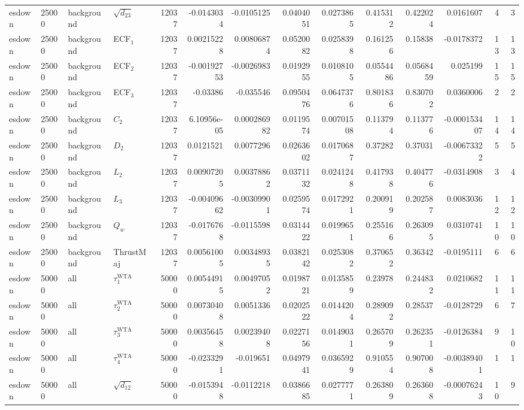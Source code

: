 \begin{landscape}
\begin{longtable}{llll r rrrr rr r rr}
esdown & 25000 & background & $\sqrt{d_{23}}$ & 12037 & -0.0143034 & -0.0105125 & 0.0404051 & 0.0273865 & 0.415312 & 0.422024 & 0.0161607 & 4 & 3 \\
esdown & 25000 & background & ECF$_1$ & 12037 & 0.00215228 & 0.00806874 & 0.0520082 & 0.0258398 & 0.161256 & 0.15838 & -0.0178372 & 13 & 13 \\
esdown & 25000 & background & ECF$_2$ & 12037 & -0.00192753 & -0.0026983 & 0.0192955 & 0.0108105 & 0.0554486 & 0.0568459 & 0.025199 & 15 & 15 \\
esdown & 25000 & background & ECF$_3$ & 12037 & -0.03386 & -0.035546 & 0.0950476 & 0.0647376 & 0.801836 & 0.830702 & 0.0360006 & 2 & 2 \\
esdown & 25000 & background & $C_2$ & 12037 & 6.10956e-05 & 0.000286982 & 0.0119574 & 0.00701508 & 0.113794 & 0.113776 & -0.000153407 & 14 & 14 \\
esdown & 25000 & background & $D_2$ & 12037 & 0.0121521 & 0.0077296 & 0.0263602 & 0.0170687 & 0.37282 & 0.37031 & -0.00673322 & 5 & 5 \\
esdown & 25000 & background & $L_2$ & 12037 & 0.00907205 & 0.00378862 & 0.0371132 & 0.0241248 & 0.417938 & 0.404776 & -0.0314908 & 3 & 4 \\
esdown & 25000 & background & $L_3$ & 12037 & -0.00409662 & -0.00309901 & 0.0259574 & 0.0172921 & 0.200919 & 0.202587 & 0.0083036 & 12 & 12 \\
esdown & 25000 & background & $Q_w$ & 12037 & -0.0176768 & -0.0115598 & 0.0314422 & 0.0199651 & 0.255166 & 0.263095 & 0.0310741 & 10 & 10 \\
esdown & 25000 & background & ThrustMaj & 12037 & 0.00561005 & 0.00348935 & 0.0382142 & 0.0253082 & 0.370652 & 0.36342 & -0.0195111 & 6 & 6 \\
esdown & 50000 & all & $\tau_1^{\mathrm{WTA}}$ & 50000 & 0.00544915 & 0.00497052 & 0.0198721 & 0.0135859 & 0.23978 & 0.244832 & 0.0210682 & 11 & 11 \\
esdown & 50000 & all & $\tau_2^{\mathrm{WTA}}$ & 50000 & 0.00730408 & 0.0051336 & 0.0202522 & 0.0144204 & 0.289092 & 0.28537 & -0.0128729 & 6 & 7 \\
esdown & 50000 & all & $\tau_3^{\mathrm{WTA}}$ & 50000 & 0.00356458 & 0.00239408 & 0.0227156 & 0.0149031 & 0.265709 & 0.262351 & -0.0126384 & 9 & 10 \\
esdown & 50000 & all & $\tau_4^{\mathrm{WTA}}$ & 50000 & -0.0233291 & -0.019651 & 0.0497941 & 0.0365929 & 0.910554 & 0.907008 & -0.00389401 & 1 & 1 \\
esdown & 50000 & all & $\sqrt{d_{12}}$ & 50000 & -0.0153948 & -0.0112218 & 0.0386685 & 0.0277771 & 0.263809 & 0.263608 & -0.00076243 & 10 & 9 \\

\end{longtable}
\end{landscape}
